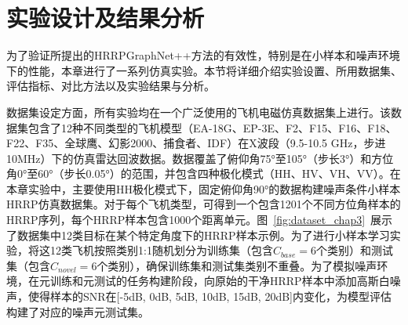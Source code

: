 \section{实验设计及结果分析}
\label{sec:noise_experiments}

为了验证所提出的HRRPGraphNet++方法的有效性，特别是在小样本和噪声环境下的性能，本章进行了一系列仿真实验。本节将详细介绍实验设置、所用数据集、评估指标、对比方法以及实验结果与分析。

数据集设定方面，所有实验均在一个广泛使用的飞机电磁仿真数据集上进行。该数据集包含了12种不同类型的飞机模型（EA-18G、EP-3E、F2、F15、F16、F18、F22、F35、全球鹰、幻影2000、捕食者、IDF）在X波段（9.5-10.5 GHz，步进10MHz）下的仿真雷达回波数据。数据覆盖了俯仰角75°至105°（步长3°）和方位角0°至60°（步长0.05°）的范围，并包含四种极化模式（HH、HV、VH、VV）。在本章实验中，主要使用HH极化模式下，固定俯仰角90°的数据构建噪声条件小样本HRRP仿真数据集。对于每个飞机类型，可得到一个包含1201个不同方位角样本的HRRP序列，每个HRRP样本包含1000个距离单元。图~\ref{fig:dataset_chap3}~展示了数据集中12类目标在某个特定角度下的HRRP样本示例。为了进行小样本学习实验，将这12类飞机按照类别1:1随机划分为训练集（包含$C_{base}=6$个类别）和测试集（包含$C_{novel}=6$个类别），确保训练集和测试集类别不重叠。为了模拟噪声环境，在元训练和元测试的任务构建阶段，向原始的干净HRRP样本中添加高斯白噪声，使得样本的SNR在[-5dB, 0dB, 5dB, 10dB, 15dB, 20dB]内变化，为模型评估构建了对应的噪声元测试集。

